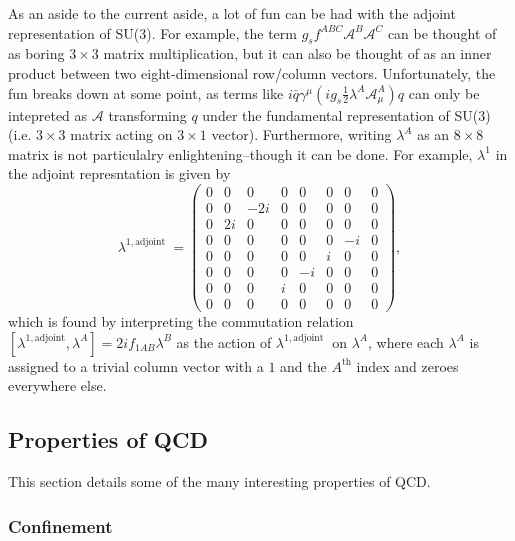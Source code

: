 As an aside to the current aside, a lot of fun can be had with the adjoint representation of SU(3). For example, the term $g_s f^{ABC} \mathcal{A}^B \mathcal{A}^C$  can be thought of as boring $3\times3$ matrix multiplication, but it can also be thought of as an inner product between two eight-dimensional row/column vectors. Unfortunately, the fun breaks down at some point, as terms like $i \bar{q} \gamma^\mu (i g_s \frac{1}{2} \lambda^A \mathcal{A}_\mu^A) q$  can only be intepreted as $\mathcal{A}$ transforming $q$ under the fundamental representation of SU(3) (i.e. $3\times3$ matrix acting on $3\times1$ vector). Furthermore, writing $\lambda^A$ as an $8\times8$ matrix is not particulalry enlightening--though it can be done. For example, $\lambda^1$ in the adjoint represntation is given by
%
\begin{equation*}
\lambda^{1, \text {adjoint }}=\left(\begin{array}{cccccccc}
0 & 0 & 0 & 0 & 0 & 0 & 0 & 0 \\
0 & 0 & -2i & 0 & 0 & 0 & 0 & 0 \\
0 & 2i & 0 & 0 & 0 & 0 & 0 & 0 \\
0 & 0 & 0 & 0 & 0 & 0 & -i & 0 \\
0 & 0 & 0 & 0 & 0 & i & 0 & 0 \\
0 & 0 & 0 & 0 & -i & 0 & 0 & 0 \\
0 & 0 & 0 & i & 0 & 0 & 0 & 0 \\
0 & 0 & 0 & 0 & 0 & 0 & 0 & 0
\end{array}\right),
\end{equation*}
which is found by interpreting the commutation relation $[\lambda^{1, \text {adjoint}}, \lambda^A] = 2if_{1AB}\lambda^B$ as the action of $\lambda^{1, \text {adjoint }}$ on $\lambda^A$, where each $\lambda^A$ is assigned to a trivial column vector with a $1$ and the $A^{\text {th}}$ index and zeroes everywhere else.
%


\subsection{Properties of QCD}
\label{sec:qcd_features}

This section details some of the many interesting properties of QCD.

\subsubsection{Confinement}
\label{sec:qcd_confinement}

